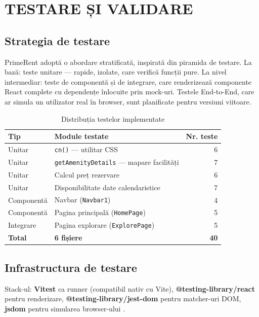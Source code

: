 \documentclass[12pt,a4paper,oneside]{report}
\begin{document}
\chapter{TESTARE ȘI VALIDARE}

\section{Strategia de testare}

PrimeRent adoptă o abordare stratificată, inspirată din piramida de testare. La bază: teste unitare — rapide, izolate, care verifică funcții pure. La nivel intermediar: teste de componentă și de integrare, care renderizează componente React complete cu dependențe înlocuite prin mock-uri. Testele End-to-End, care ar simula un utilizator real în browser, sunt planificate pentru versiuni viitoare.

\begin{table}[H]
\centering
\caption{Distribuția testelor implementate}
\label{tab:teste}
\begin{tabular}{l l r}
\toprule
\textbf{Tip} & \textbf{Module testate} & \textbf{Nr. teste} \\
\midrule
Unitar & \texttt{cn()} — utilitar CSS           & 6 \\
Unitar & \texttt{getAmenityDetails} — mapare facilități & 7 \\
Unitar & Calcul preț rezervare                & 6 \\
Unitar & Disponibilitate date calendaristice   & 7 \\
Componentă & Navbar (\texttt{Navbar1})          & 4 \\
Componentă & Pagina principală (\texttt{HomePage}) & 5 \\
Integrare & Pagina explorare (\texttt{ExplorePage}) & 5 \\
\midrule
\textbf{Total} & \textbf{6 fișiere}             & \textbf{40} \\
\bottomrule
\end{tabular}
\end{table}


\section{Infrastructura de testare}

Stack-ul: \textbf{Vitest} ca runner (compatibil nativ cu Vite), \textbf{@testing-library/react} pentru renderizare, \textbf{@testing-library/jest-dom} pentru matcher-uri DOM, \textbf{jsdom} pentru simularea browser-ului \cite{vitest, testing-library}.
\end{document}
